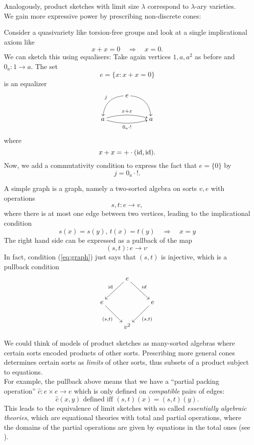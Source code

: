 Analogously, product sketches with limit size $\lambda$ correspond to $\lambda$-ary varieties. \\

We gain more expressive power by prescribing non-discrete cones:

\begin{Example}
Consider a quasivariety like torsion-free groups and look at a single implicational axiom like
\[ x + x = 0 \quad \Rightarrow \quad x = 0. \]
We can sketch this using equalisers: Take again vertices $1,a,a^2$ as before and $0_a : 1 \to a$. The set
\[ e = \{ x : x + x = 0 \} \]
is an equalizer
\[
\xymatrix{
& e \ar@/_1pc/[ld]_{j} \ar@/^1pc/[rd] & \\
a \ar@/^/[rr]^{x + x} \ar@/_/[rr]_{0_a \circ !} & & a
}\]
where \[ x + x = + \cdot (\textrm{id},\textrm{id}). \]
Now, we add a commutativity condition to express the fact that $e = \{0\}$ by \[ j = 0_a\cdot !. \]
\end{Example}

\begin{Example}
A simple graph is a graph, namely a two-sorted algebra on sorts $v,e$ with operations
\[ s, t : e \to v, \]
where there is at most one edge between two vertices, leading to the implicational condition
\begin{equation}\label{eq:graph} s(x) = s(y),\, t(x) = t(y) \quad \Rightarrow \quad x = y \end{equation}
The right hand side can be expressed as a pullback of the map \[ (s,t) : e \to v^. \]
In fact, condition (\ref{eq:graph}) just says that $(s,t)$ is injective, which is a pullback condition
\[
\xymatrix{
 & e \ar[ld]_{\id} \ar[rd]^{id} & \\
e \ar[rd]_{(s,t)} &  & e \ar[ld]^{(s,t)} \\
 & v^2 &
}\]
\end{Example}

We could think of models of product sketches as many-sorted algebras where certain sorts encoded products of other sorts. Prescribing more general cones determines certain sorts as \emph{limits} of other sorts, thus subsets of a product subject to equations. \\

For example, the pullback above means that we have a ``partial packing operation'' $\hat c : e \times e \to e$ which is only defined on \emph{compatible} pairs of edges:
\[ \hat c(x,y) \text{ defined iff } (s,t)(x) = (s,t)(y). \]
This leads to the equivalence of limit sketches with so called \emph{essentially algebraic theories}, which are equational theories with total and partial operations, where the domains of the partial operations are given by equations in the total ones (see \cite[Chapter 3.D]{AdamekRosicky}). \\

